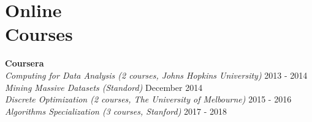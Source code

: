 \section{Online\\Courses}

    \textbf{Coursera} \vspace{0mm}\\
        \hspace*{2ex}\textsl{Computing for Data Analysis (2 courses, Johns Hopkins University)}
                        \hfill 2013 - 2014 \vspace{0mm}\\
        \hspace*{2ex}\textsl{Mining Massive Datasets (Standord)}
                         \hfill December 2014 \vspace{0mm}\\
        \hspace*{2ex}\textsl{Discrete Optimization (2 courses, The University of Melbourne)}
                         \hfill 2015 - 2016 \vspace{0mm}\\
        \hspace*{2ex}\textsl{Algorithms Specialization (3 courses, Stanford)}
                         \hfill 2017 - 2018 \vspace{0mm}\\
